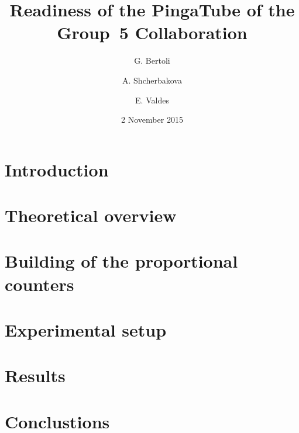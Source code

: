 \documentclass[a4paper, 10pt, notitlepage]{article}
\author{G. Bertoli \and A. Shcherbakova \and E. Valdes}
\title{Readiness of the PingaTube of the Group~5 Collaboration}
\date{2 November 2015}
\begin{document}
\maketitle

\begin{abstract}
  
\end{abstract}

\section{Introduction}
\label{sec:intro}


\section{Theoretical overview}
\label{sec:theory}


\section{Building of the proportional counters}
\label{sec:build-prop-count}


\section{Experimental setup}
\label{sec:setup}


\section{Results}
\label{sec:results}


\section{Conclustions}
\label{sec:conclusions}


\printbibliography
\end{document}
